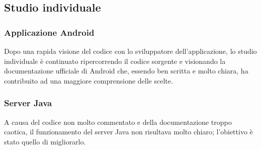     \subsection{Studio individuale}
      \subsubsection{Applicazione Android}
        Dopo una rapida visione del codice con lo sviluppatore dell'applicazione, lo studio individuale è continuato ripercorrendo il codice sorgente e visionando la documentazione ufficiale di Android che, essendo ben scritta e molto chiara, ha contribuito ad una maggiore comprensione delle scelte.
      \subsubsection{Server Java}
        A causa del codice non molto commentato e della documentazione troppo caotica, il funzionamento del server Java non risultava molto chiaro; l'obiettivo è stato quello di migliorarlo.
      \newpage
